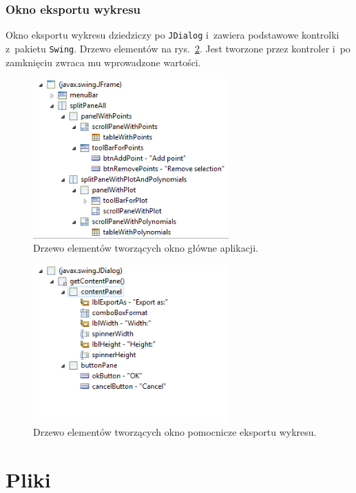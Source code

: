 \documentclass[10pt,a4paper]{article}
\newcommand{\f}[1]{\texttt{#1}}
\begin{document}
\subsubsection{Okno eksportu wykresu}

Okno eksportu wykresu dziedziczy po \f{JDialog} i~zawiera podstawowe kontrolki
z~pakietu \f{Swing}. Drzewo elementów na rys.~\ref{fig:wykres-rysuj-widok}. Jest
tworzone przez kontroler i~po zamknięciu zwraca mu wprowadzone wartości.

\begin{figure}[p]
  \centering
  \includegraphics[width=0.67\textwidth]{figury/aplikacja-widok}
  \caption{Drzewo elementów tworzących okno główne aplikacji.}
  \label{fig:aplikacja-widok}
\end{figure}

\begin{figure}[p]
  \centering
  \includegraphics[width=0.67\textwidth]{figury/wykres-rysuj-widok}
  \caption{Drzewo elementów tworzących okno pomocnicze eksportu wykresu.}
  \label{fig:wykres-rysuj-widok}
\end{figure}

\section{Pliki}
\end{document}
